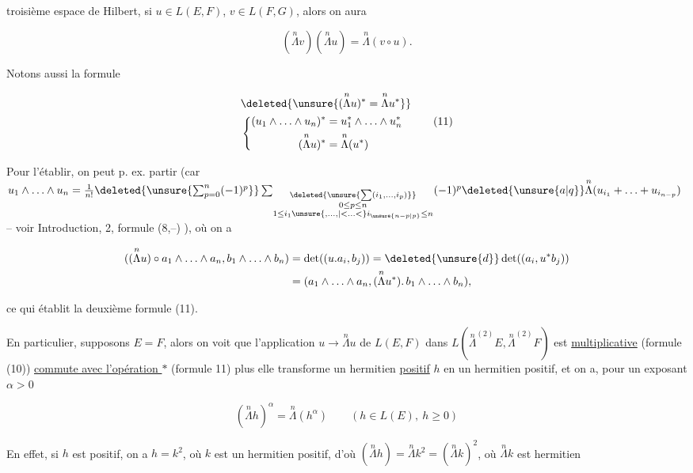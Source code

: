 troisième espace de Hilbert, si $u\in L(E,F)$, $v\in L(F,G)$, alors on aura

\[
(\overset{n}{\Lambda}v)(\overset{n}{\Lambda}u)=\overset{n}{\Lambda}(v\circ u).\tag*{(10)}
\]

Notons aussi la formule

\[
\begin{aligned}
&\deleted{\unsure{(\overset{n}{\Lambda}u)^*=\overset{n}{\Lambda}u^*}}\\
&\left\{\begin{aligned}
(u_1\wedge\ldots\wedge u_n)^*&=u_1^*\wedge\ldots\wedge u_n^*\\
(\overset{n}{\Lambda}u)^*&=\overset{n}{\Lambda}(u^*)
\end{aligned}\right.
\end{aligned}\tag*{(11)}
\]


Pour l'établir, on peut p. ex.   partir  (car $u_1\wedge\ldots\wedge u_n=\frac1{n!}\deleted{\unsure{\sum_{p=0}^{n}(-1)^p}}\sum_{\substack{\deleted{\unsure{\sum(i_1,\ldots,i_p)}}\\0\leq p\leq n\\1\leq i_1\unsure{,\ldots,|<\ldots<}i_{\unsure{n-p|p}}\leq n}}(-1)^p\deleted{\unsure{a|q}}\overset{n}{\Lambda}(u_{i_1}+\ldots+u_{i_{n-p}})$ -- voir Introduction, 2, formule (8,--) ), où on a

\[
\begin{aligned}
((\overset{n}{\Lambda}u)\circ a_1\wedge\ldots\wedge a_n,b_1\wedge\ldots\wedge b_n)&=\det((u.a_i,b_j))=\deleted{\unsure{d}}\det((a_i,u^*b_j))\\
&=(a_1\wedge\ldots\wedge a_n,(\overset{n}{\Lambda}u^*).\,b_1\wedge\ldots\wedge b_n),
\end{aligned}
\]

ce qui établit  la deuxième formule (11).

En particulier, supposons $E=F$, alors on voit que l'application $u\longrightarrow\overset{n}{\Lambda}u$ de $L(E,F)$ dans $L(\overset{n}{\Lambda}^{(2)}E,\overset{n}{\Lambda}^{(2)}F)$ est \uline{multiplicative} (formule (10)) \uline{commute avec l'opération $*$} (formule 11)   plus elle transforme  un hermitien \uline{positif} $h$ en un hermitien positif, et on a, pour  un exposant  $\alpha>0$

\[
(\overset{n}{\Lambda}h)^\alpha=\overset{n}{\Lambda}(h^\alpha)\qquad(h\in L(E),\ h\geq0)\tag*{(12)}
\]

En effet, si $h$ est positif, on a $h=k^2$, où $k$ est un hermitien positif, d'où $(\overset{n}{\Lambda}h)=\overset{n}{\Lambda}k^2=(\overset{n}{\Lambda}k)^2$, où $\overset{n}{\Lambda}k$ est hermitien 
